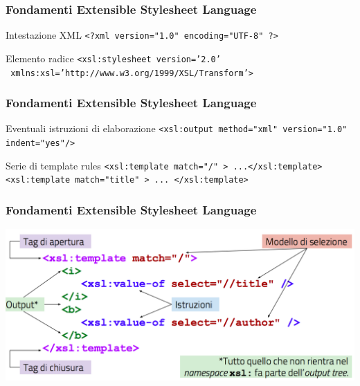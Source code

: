 \begin{frame}
    \frametitle{Fondamenti Extensible Stylesheet Language}
    \addtocounter{nframe}{1}
    

     \begin{block}{Intestazione XML}
        \texttt{<?xml version="1.0" encoding="UTF-8" ?>}
     \end{block}

     \begin{block}{Elemento radice}
        \texttt{<xsl:stylesheet version='2.0'}
            \\\texttt{  xmlns:xsl='http://www.w3.org/1999/XSL/Transform'>}
     \end{block}
    
\end{frame}

\begin{frame}
    \frametitle{Fondamenti Extensible Stylesheet Language}
    \addtocounter{nframe}{1}
    

     \begin{block}{Eventuali istruzioni di elaborazione}
        \texttt{<xsl:output method="xml" version="1.0" indent="yes"/>}
     \end{block}

     \begin{block}{Serie di template rules}
        \texttt{<xsl:template match="/" > ...</xsl:template>} 
        \\\texttt{<xsl:template match="title" > ... </xsl:template>}
     \end{block}
    
\end{frame}

\begin{frame}
    \frametitle{Fondamenti Extensible Stylesheet Language}
    \addtocounter{nframe}{1}
    
    \begin{center}
        \includegraphics[width=.9\textwidth]{imgs/template-modello.png}
    \end{center}

\end{frame}

